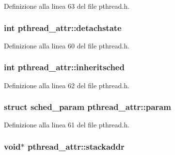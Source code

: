Definizione alla linea 63 del file pthread.\+h.

\hypertarget{structpthread__attr_a2ac0f3f9d4513024bbafc7db17c25a46}{
\subsubsection[{detachstate}]{\setlength{\rightskip}{0pt plus 5cm}int pthread\+\_\+attr\+::detachstate}}\label{structpthread__attr_a2ac0f3f9d4513024bbafc7db17c25a46}


Definizione alla linea 60 del file pthread.\+h.

\hypertarget{structpthread__attr_ab6bef83bc858c0ffb3c8d0b461ba4396}{
\subsubsection[{inheritsched}]{\setlength{\rightskip}{0pt plus 5cm}int pthread\+\_\+attr\+::inheritsched}}\label{structpthread__attr_ab6bef83bc858c0ffb3c8d0b461ba4396}


Definizione alla linea 62 del file pthread.\+h.

\hypertarget{structpthread__attr_a371c70c9e51a2444860395f7045bbd3e}{
\subsubsection[{param}]{\setlength{\rightskip}{0pt plus 5cm}struct sched\+\_\+param pthread\+\_\+attr\+::param}}\label{structpthread__attr_a371c70c9e51a2444860395f7045bbd3e}


Definizione alla linea 61 del file pthread.\+h.

\hypertarget{structpthread__attr_a004b9c2b7c75177f4de0262277f48333}{
\subsubsection[{stackaddr}]{\setlength{\rightskip}{0pt plus 5cm}void$\ast$ pthread\+\_\+attr\+::stackaddr}}\label{structpthread__attr_a004b9c2b7c75177f4de0262277f48333}


